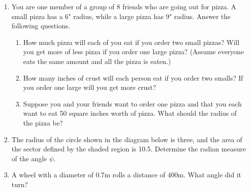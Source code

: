 \begin{enumerate}
\begin{enumerate}
\end{enumerate}


\clearpage

\item You are one member of a group of 8 friends who are going out for pizza.  A small pizza has a 6" radius, while a large pizza has 9"  radius.  Answer the following questions.
\begin{enumerate}
	\item How much pizza will each of you eat if you order two small pizzas?  Will you get more of less pizza if you order one large pizza? (Assume everyone eats the same amount and all the pizza is eaten.)
	\vfill
	\item How many inches of crust will each person eat if you order two smalls?  If you order one large will you get more crust?
	\vfill
	\item Suppose you and your friends want to order one pizza and that you each want to eat 50 square inches worth of pizza.  What should the radius of the pizza be?
	\vfill
\end{enumerate}

\clearpage

\item The radius of the circle shown in the diagram below is three, and
  the area of the sector defined by the shaded region is 10.5.
  Determine the radian measure of the angle $\psi$.


  \vfill

\item A wheel with a diameter of 0.7m rolls a distance of 400m. What angle did it turn?

  \vfill
    

\end{enumerate}


